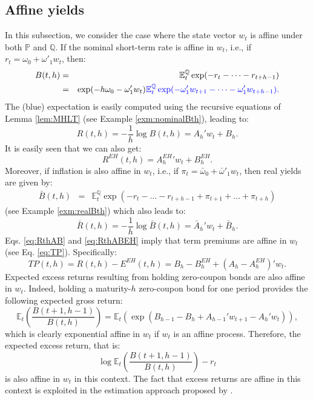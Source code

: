 \documentclass[
  12pt,
]{book}
\theoremstyle{definition}
\theoremstyle{definition}
\theoremstyle{definition}
\theoremstyle{definition}
\theoremstyle{remark}
\begin{document}
\hypertarget{affine-yields}{%
\subsection{Affine yields}\label{affine-yields}}

In this subsection, we consider the case where the state vector \(w_t\) is affine under both \(\mathbb{P}\) and \(\mathbb{Q}\). If the nominal short-term rate is affine in \(w_t\), i.e., if \(r_t = \omega_0 + \omega'_1 w_t\), then:
\begin{eqnarray*}
B(t,h) &=& \mathbb{E}^{\mathbb{Q}}_t \exp (-r_{t}-\dots-r_{t+h-1})\\
&=& \exp(-h\omega_0 - \omega'_1 w_t) \color{blue}{\mathbb{E}^{\mathbb{Q}}_t \exp (- \omega'_1 w_{t+1}-\dots- \omega'_1 w_{t+h-1})}.
\end{eqnarray*}
The (blue) expectation is easily computed using the recursive equations of Lemma \ref{lem:MHLT} (see Example \ref{exm:nominalBth}), leading to:
\begin{equation}
R(t,h)= -  \frac{1}{h}   \log   B(t,h) = A_h'w_t + B_h.\label{eq:RthAB}
\end{equation}
It is easily seen that we can also get:
\begin{equation}
R^{EH}(t,h) = {A^{EH}_h}'w_t + B^{EH}_h.\label{eq:RthABEH}
\end{equation}
Moreover, if inflation is also affine in \(w_t\), i.e., if \(\pi_{t} = \bar\omega_0 + \bar\omega'_1 w_t\), then real yields are given by:
\begin{eqnarray*}
\bar{B}(t,h) &=& \mathbb{E}^{\mathbb{Q}}_t \exp(-r_{t}-\dots-r_{t+h-1}+\pi_{t+1}+\dots+\pi_{t+h})
\end{eqnarray*}
(see Example \ref{exm:realBth}) which also leads to:
\begin{equation}
\bar{R}(t,h) = -  \frac{1}{h}   \log   \bar{B}(t,h) = \bar{A}_h'w_t + \bar{B}_h.\label{eq:RbarthAB}
\end{equation}
Eqs. \eqref{eq:RthAB} and \eqref{eq:RthABEH} imply that term premiums are affine in \(w_t\) (see Eq. \eqref{eq:TP}). Specifically:
\[
TP(t,h) = R(t,h) - E^{EH}(t,h) = B_h - B_h^{EH} + (A_h - A_h^{EH})'w_t.
\]
Expected excess returns resulting from holding zero-coupon bonds are also affine in \(w_t\). Indeed, holding a maturity-\(h\) zero-coupon bond for one period provides the following expected gross return:
\[
\mathbb{E}_t\left(\frac{B(t+1,h-1)}{B(t,h)}\right) = \mathbb{E}_t\left(\exp(B_{h-1} - B_h + A_{h-1}'w_{t+1} - A_h'w_{t})\right),
\]
which is clearly exponential affine in \(w_t\) if \(w_t\) is an affine process. Therefore, the expected excess return, that is:
\[
\log \mathbb{E}_t\left(\frac{B(t+1,h-1)}{B(t,h)}\right) - r_t
\]
is also affine in \(w_t\) in this context. The fact that excess returns are affine in this context is exploited in the estimation approach proposed by \citet{Adrian_Crump_Moench_2013}.
\end{document}
